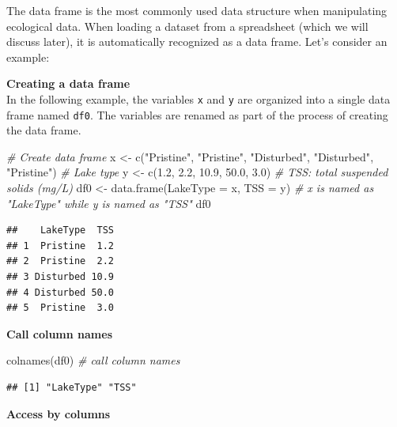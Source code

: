 \documentclass[
]{book}
\newenvironment{Shaded}{\begin{snugshade}}{\end{snugshade}}
\newcommand{\AttributeTok}[1]{\textcolor[rgb]{0.77,0.63,0.00}{#1}}
\newcommand{\CommentTok}[1]{\textcolor[rgb]{0.56,0.35,0.01}{\textit{#1}}}
\newcommand{\FloatTok}[1]{\textcolor[rgb]{0.00,0.00,0.81}{#1}}
\newcommand{\FunctionTok}[1]{\textcolor[rgb]{0.00,0.00,0.00}{#1}}
\newcommand{\NormalTok}[1]{#1}
\newcommand{\OtherTok}[1]{\textcolor[rgb]{0.56,0.35,0.01}{#1}}
\newcommand{\StringTok}[1]{\textcolor[rgb]{0.31,0.60,0.02}{#1}}
\begin{document}
The data frame is the most commonly used data structure when manipulating ecological data. When loading a dataset from a spreadsheet (which we will discuss later), it is automatically recognized as a data frame. Let's consider an example:

\textbf{Creating a data frame}\\
In the following example, the variables \texttt{x} and \texttt{y} are organized into a single data frame named \texttt{df0}. The variables are renamed as part of the process of creating the data frame.

\begin{Shaded}
\begin{Highlighting}[]
\CommentTok{\# Create data frame}
\NormalTok{x }\OtherTok{\textless{}{-}} \FunctionTok{c}\NormalTok{(}\StringTok{"Pristine"}\NormalTok{, }\StringTok{"Pristine"}\NormalTok{, }\StringTok{"Disturbed"}\NormalTok{, }\StringTok{"Disturbed"}\NormalTok{, }\StringTok{"Pristine"}\NormalTok{) }\CommentTok{\# Lake type}
\NormalTok{y }\OtherTok{\textless{}{-}} \FunctionTok{c}\NormalTok{(}\FloatTok{1.2}\NormalTok{, }\FloatTok{2.2}\NormalTok{, }\FloatTok{10.9}\NormalTok{, }\FloatTok{50.0}\NormalTok{, }\FloatTok{3.0}\NormalTok{) }\CommentTok{\# TSS: total suspended solids (mg/L)}
\NormalTok{df0 }\OtherTok{\textless{}{-}} \FunctionTok{data.frame}\NormalTok{(}\AttributeTok{LakeType =}\NormalTok{ x, }\AttributeTok{TSS =}\NormalTok{ y) }\CommentTok{\# x is named as "LakeType" while y is named as "TSS"}
\NormalTok{df0}
\end{Highlighting}
\end{Shaded}

\begin{verbatim}
##    LakeType  TSS
## 1  Pristine  1.2
## 2  Pristine  2.2
## 3 Disturbed 10.9
## 4 Disturbed 50.0
## 5  Pristine  3.0
\end{verbatim}

\textbf{Call column names}

\begin{Shaded}
\begin{Highlighting}[]
\FunctionTok{colnames}\NormalTok{(df0) }\CommentTok{\# call column names}
\end{Highlighting}
\end{Shaded}

\begin{verbatim}
## [1] "LakeType" "TSS"
\end{verbatim}

\textbf{Access by columns}
\end{document}
